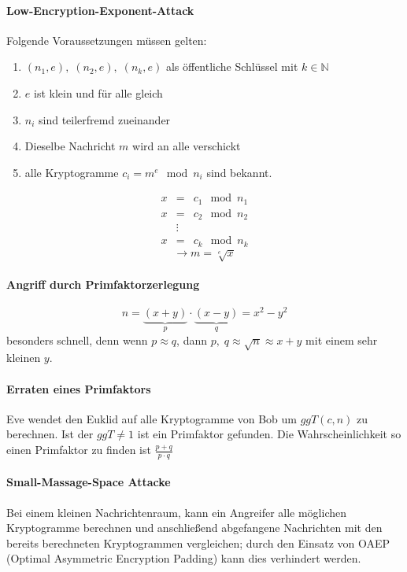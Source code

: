 \documentclass[8pt,a4paper,landscape]{article}
\begin{document}
\begin{multicols}{4}
\paragraph{Low-Encryption-Exponent-Attack}
Folgende Voraussetzungen müssen gelten: \begin{enumerate}[itemsep=1pt] 
\item $(n_1, e), \; (n_2, e), \; (n_k, e)$ als öffentliche Schlüssel mit $k \in \mathbb{N}$
\item $e$ ist klein und für alle gleich
\item $n_i$ sind teilerfremd zueinander
\item Dieselbe Nachricht $m$ wird an alle verschickt
\item alle Kryptogramme $c_i = m^e \mod n_i$ sind bekannt.
\end{enumerate}
\begin{eqnarray}
x &=& c_{1} \mod n_{1} \nonumber\\[-3pt]
x &=& c_{2} \mod n_{2} \nonumber\\[-3pt]
&\vdots & \nonumber \\[-3pt]
x &=& c_{k} \mod n_{k} \nonumber
\end{eqnarray} \[\boxed{\rightarrow m = \sqrt[e]{x}}\]

\paragraph{Angriff durch Primfaktorzerlegung} 
\[ n = \underbrace{(x+y)}_{p} \cdot \underbrace{(x-y)}_{q} = x^2 -y^2\]
besonders schnell, denn wenn $ p \approx q$, dann
$ p, \; q \approx \sqrt{n} \approx x + y$
mit einem sehr kleinen $y$. 

\paragraph{Erraten eines Primfaktors} Eve wendet den Euklid auf alle Kryptogramme von Bob um $ggT(c,n)$ zu berechnen. Ist der $ggT \not= 1$ ist ein Primfaktor gefunden. Die Wahrscheinlichkeit so einen Primfaktor zu finden ist $\frac{p + q}{p \cdot q}$

\paragraph{Small-Massage-Space Attacke} Bei einem kleinen Nachrichtenraum, kann ein Angreifer alle möglichen Kryptogramme berechnen und anschließend abgefangene Nachrichten mit den bereits berechneten Kryptogrammen vergleichen; durch den Einsatz von OAEP (Optimal Asymmetric Encryption Padding) kann dies verhindert werden. 


\end{multicols}
\end{document}
